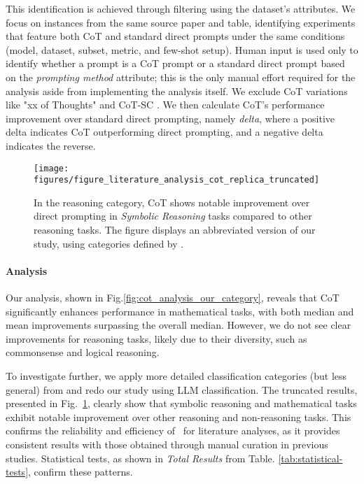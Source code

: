This identification is achieved through filtering using the dataset's attributes. 
We focus on instances from the same source paper and table, identifying experiments that feature both CoT and standard direct prompts under the same conditions (model, dataset, subset, metric, and few-shot setup).
Human input is used only to identify whether a prompt is a CoT prompt or a standard direct prompt based on the \textit{prompting method} attribute; this is the only manual effort required for the analysis aside from implementing the analysis itself. 
We exclude CoT variations like "xx of Thoughts" \citep{yao2024tree} and CoT-SC \citep{wang2022self}. 
We then calculate CoT's performance improvement over standard direct prompting, namely \emph{delta}, where a positive delta indicates CoT outperforming direct prompting, and a negative delta indicates the reverse.


\begin{figure}[t!]
    \centering  
    \texttt{[image: figures/figure\_literature\_analysis\_cot\_replica\_truncated]}
    \caption{In the reasoning category, CoT shows notable improvement over direct prompting in \emph{Symbolic Reasoning} tasks compared to other reasoning tasks. The figure displays an abbreviated version of our study, using categories defined by \citet{sprague2024cot}.
    }
    \label{fig:cot_improvement_verification}
\end{figure}



\paragraph{Analysis} 
Our analysis, shown in Fig.\ref{fig:cot_analysis_our_category}, reveals that CoT significantly enhances performance in mathematical tasks, with both median and mean improvements surpassing the overall median. However, we do not see clear improvements for reasoning tasks, likely due to their diversity, such as commonsense and logical reasoning. 

To investigate further, we apply more detailed classification categories (but less general) from \citet{sprague2024cot} and redo our study using LLM classification. 
The truncated results, presented in Fig.~\ref{fig:cot_improvement_verification}, clearly show that symbolic reasoning and mathematical tasks exhibit notable improvement over other reasoning and non-reasoning tasks. 
This confirms the reliability and efficiency of \datasetname~for literature analyses, as it provides consistent results with those obtained through manual curation in previous studies. 
Statistical tests, as shown in \textit{Total Results} from Table. \ref{tab:statistical-tests}, confirm these patterns.


